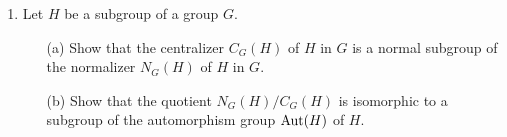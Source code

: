 \documentclass[12pt]{article}
\theoremstyle{theorem}
\theoremstyle{definition}
\newcommand{\F}{\mathbb{F}}
\begin{document}
\begin{enumerate}
\medskip

\item Let $H$ be a subgroup of a group $G$.  
\begin{itemize}
\item[(a)] Show that the centralizer $C_G(H)$ of $H$ in $G$ is a normal subgroup of the normalizer $N_G(H)$ of $H$ in $G$.
\item[(b)] Show that the quotient $N_G(H)/C_G(H)$ is isomorphic to a subgroup of the automorphism group ${\rm Aut}(H)$ of $H$. 
\end{itemize}

\medskip
%

%


\end{enumerate}
\end{document}
